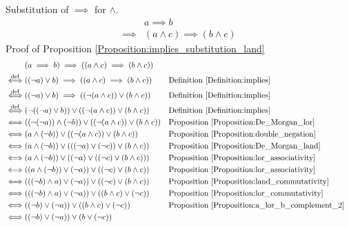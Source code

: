 \begin{prop}
\label{Proposition:implies_substitution_land}
Substitution of $\implies$ for $\land$.
\begin{align*}
& a \implies b \\
\implies & (a \land c) \implies (b \land c)
\end{align*}
Proof of Proposition \ref{Proposition:implies_substitution_land}
\begin{align*}
& (a \implies b) \implies ((a \land c) \implies (b \land c)) \\
\overset{\operatorname{def}}{\iff} & ((\lnot a) \lor b) \implies ((a \land c) \implies (b \land c))
& & \text{Definition \ref{Definition:implies}} \\
\overset{\operatorname{def}}{\iff} & ((\lnot a) \lor b) \implies ((\lnot (a \land c)) \lor (b \land c))
& & \text{Definition \ref{Definition:implies}} \\
\overset{\operatorname{def}}{\iff} & (\lnot ((\lnot a) \lor b)) \lor ((\lnot (a \land c)) \lor (b \land c))
& & \text{Definition \ref{Definition:implies}} \\
\iff & ((\lnot (\lnot a)) \land (\lnot b)) \lor ((\lnot (a \land c)) \lor (b \land c))
& & \text{Proposition \ref{Proposition:De_Morgan_lor}} \\
\iff & (a \land (\lnot b)) \lor ((\lnot (a \land c)) \lor (b \land c))
& & \text{Proposition \ref{Proposition:double_negation}} \\
\iff & (a \land (\lnot b)) \lor (((\lnot a) \lor (\lnot c)) \lor (b \land c))
& & \text{Proposition \ref{Proposition:De_Morgan_land}} \\
\iff & (a \land (\lnot b)) \lor ((\lnot a) \lor ((\lnot c) \lor (b \land c)))
& & \text{Proposition \ref{Proposition:lor_associativity}} \\
\iff & ((a \land (\lnot b)) \lor (\lnot a)) \lor ((\lnot c) \lor (b \land c))
& & \text{Proposition \ref{Proposition:lor_associativity}} \\
\iff & (((\lnot b) \land a) \lor (\lnot a)) \lor ((\lnot c) \lor (b \land c))
& & \text{Proposition \ref{Proposition:land_commutativity}} \\
\iff & (((\lnot b) \land a) \lor (\lnot a)) \lor ((b \land c) \lor (\lnot c))
& & \text{Proposition \ref{Proposition:lor_commutativity}} \\
\iff & ((\lnot b) \lor (\lnot a)) \lor ((b \land c) \lor (\lnot c))
& & \text{Proposition \ref{Proposition:a_lor_b_complement_2}} \\
\iff & ((\lnot b) \lor (\lnot a)) \lor (b \lor (\lnot c))

\end{align*}
\end{prop}
